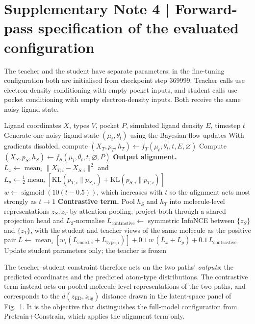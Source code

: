 \section*{Supplementary Note 4 | Forward-pass specification of the evaluated configuration}

The teacher and the student have separate parameters; in the fine-tuning configuration both are initialised from checkpoint step 369999. Teacher calls use electron-density conditioning with empty pocket inputs, and student calls use pocket conditioning with empty electron-density inputs. Both receive the same noisy ligand state.

\begin{algorithm}[H]
\caption{Constrained training step as implemented}
\begin{algorithmic}[1]
\Require Ligand coordinates $X$, types $V$, pocket $P$, simulated ligand density $E$, timestep $t$
\State Generate one noisy ligand state $(\mu_t,\theta_t)$ using the Bayesian-flow updates
\State With gradients disabled, compute $(X_T,p_T,h_T)\gets f_T(\mu_t,\theta_t,t,E,\varnothing)$
\State Compute $(X_S,p_S,h_S)\gets f_S(\mu_t,\theta_t,t,\varnothing,P)$
\State \textbf{Output alignment.} $L_x\gets\operatorname{mean}_i\|X_{T,i}-X_{S,i}\|^2$ and $L_p\gets\frac12\operatorname{mean}_i[\mathrm{KL}(p_{T,i}\|p_{S,i})+\mathrm{KL}(p_{S,i}\|p_{T,i})]$
\State $w\gets\operatorname{sigmoid}(10(t-0.5))$, which increases with $t$ so the alignment acts most strongly as $t\to1$
\State \textbf{Contrastive term.} Pool $h_S$ and $h_T$ into molecule-level representations $z_S,z_T$ by attention pooling, project both through a shared projection head and $L_2$-normalise
\State $L_{\mathrm{contrastive}}\gets$ symmetric InfoNCE between $\{z_S\}$ and $\{z_T\}$, with the student and teacher views of the same molecule as the positive pair
\State $L\gets\operatorname{mean}_i[w_i(L_{\mathrm{coord},i}+L_{\mathrm{type},i})]+0.1\,w\,(L_x+L_p)+0.1\,L_{\mathrm{contrastive}}$
\State Update student parameters only; the teacher is frozen
\end{algorithmic}
\end{algorithm}

The teacher--student constraint therefore acts on the two paths' \emph{outputs}: the predicted coordinates and the predicted atom-type distributions. The contrastive term instead acts on pooled molecule-level representations of the two paths, and corresponds to the $d(z_{\mathrm{ED}},z_{\mathrm{lig}})$ distance drawn in the latent-space panel of Fig.~1. It is the objective that distinguishes the full-model configuration from Pretrain+Constrain, which applies the alignment term only.
